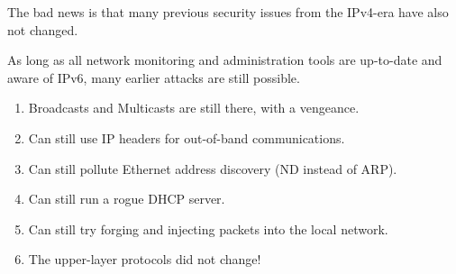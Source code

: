 The bad news is that many previous security issues from the IPv4-era have also not changed. 

As long as all network monitoring and administration tools are up-to-date and aware of IPv6, many earlier attacks are still possible.

\begin {enumerate}

\item Broadcasts and Multicasts are still there, with a vengeance.
\item Can still use IP headers for out-of-band communications.
\item Can still pollute Ethernet address discovery (ND instead of ARP).
\item Can still run a rogue DHCP server.
\item Can still try forging and injecting packets into the local network. 
\item The upper-layer protocols did not change!

\end {enumerate}




